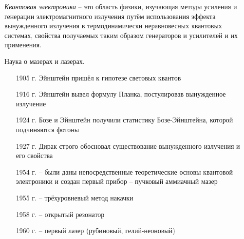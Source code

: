 

\emph{Квантовая электроника} -- это область физики, изучающая методы усиления 
и генерации электромагнитного излучения путём использования эффекта 
вынужденного излучения в термодинамически неравновесных квантовых системах, 
свойства получаемых таким образом генераторов и усилителей и их применения.

Наука о мазерах и лазерах.


\begin{enumerate}
	\item[1905 г.] Эйнштейн пришёл к гипотезе световых квантов
	\item[1916 г.] Эйнштейн вывел формулу Планка, постулировав вынужденное 
		излучение
	\item[1924 г.] Бозе и Эйнштейн получили статистику Бозе-Эйнштейна, которой 
		подчиняются фотоны
	\item[1927 г.] Дирак строго обосновал существование вынужденного излучения 
		и его свойства
\end{enumerate}


\begin{enumerate}
	\item[1954 г.] -- были даны непосредственные теоретические основы 
		квантовой электроники и создан первый прибор -- пучковый аммиачный 
		мазер
	\item[1955 г.] -- трёхуровневый метод накачки
	\item[1958 г.] -- открытый резонатор
	\item[1960 г.] -- первый лазер (рубиновый, гелий-неоновый)
\end{enumerate}

